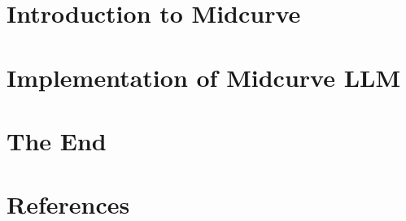 \section[Midcurve]{Introduction to Midcurve}


\section[LLMIMPL]{Implementation of Midcurve LLM}


\section[End]{The End}


\section[Refs]{References}

